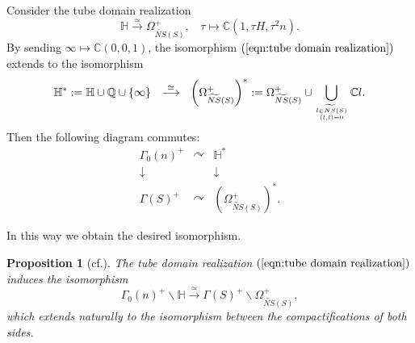 \documentclass{article}
\theoremstyle{plain}
\newtheorem{proposition}[theorem]{Proposition}%
\theoremstyle{definition}
\theoremstyle{remark}
\newcommand{\C}{{\mathbb C}}
\newcommand{\Q}{{\mathbb Q}}
\begin{document}
Consider the tube domain realization 
\begin{equation}\label{eqn:tube domain realization}
 {\mathbb H} 
\stackrel{\simeq}{\longrightarrow} 
\Omega _{\widetilde{NS}(S)}^{+}, \: \: \:  \: 
\tau \mapsto {\C}(1, \tau H, \tau ^{2}n). 
\end{equation} 
By sending   
$\infty \mapsto {\C}(0, 0, 1)$, 
the isomorphism $(\ref{eqn:tube domain realization})$ 
extends to the isomorphism 
\begin{equation}\label{eqn:extension of tube domain realization}
 {\mathbb H}^{\ast} :=  
 {\mathbb H} \cup {\Q} \cup \{ \infty \} 
\: \: \: \stackrel{\simeq}{\longrightarrow} \: \: \: 
\left(\Omega _{\widetilde{NS}(S)} ^{+} \right) ^{\ast} 
:=  \Omega _{\widetilde{NS}(S)}^{+} \cup 
\mathop{\bigcup}_{l \in \widetilde{NS}(S)\atop{(l, l)=0}} {\C}l .
\end{equation} 
Then 
the following diagram commutes:  
\begin{equation*}
\begin{array}{ccc}
  \Gamma _{0}(n)^{+}              &    \curvearrowright            &   {\mathbb H}^{\ast}    \\
     \downarrow                            &                                                 &    \downarrow                   \\
  \Gamma (S)^{+}                       &    \curvearrowright          &   \left( \Omega _{\widetilde{NS}(S)}^{+} \right) ^{\ast} .
\end{array}
\end{equation*}







In this way 
we obtain the desired isomorphism. 



\begin{proposition}[cf.\cite{Do}]\label{Kahler moduli and Fricke curve}
The tube domain realization $(\ref{eqn:tube domain realization})$ 
induces the isomorphism 
\begin{equation}\label{eqn:Fricke modular curve and Kahler moduli}
\Gamma _{0}(n)^{+} \backslash {\mathbb H} 
\stackrel{\simeq}{\longrightarrow} 
\Gamma (S)^{+} \backslash \Omega _{\widetilde{NS}(S)}^{+}, 
\end{equation}
which extends naturally to 
the isomorphism between 
the compactifications of both sides.
\end{proposition}
\end{document}
